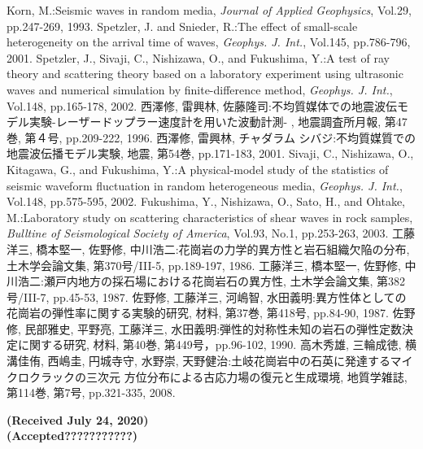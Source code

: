 \documentclass{jsce}
\begin{document}
\begin{thebibliography}{99}
\begin{spacing}{1.175}
	Korn, M.:Seismic waves in random media, 
	{\it Journal of Applied Geophysics}, Vol.29, pp.247-269, 1993.
	Spetzler, J. and Snieder, R.:The effect of small-scale heterogeneity on the arrival time of waves, 
	{\it Geophys. J. Int.}, Vol.145, pp.786-796, 2001. 
	Spetzler, J., Sivaji, C., Nishizawa, O., and Fukushima, Y.:A test of ray theory and scattering theory based on
	a laboratory experiment using ultrasonic waves and numerical simulation by finite-difference method, 
	{\it Geophys. J. Int.}, Vol.148, pp.165-178, 2002. 
\newpage
{}
	西澤修, 雷興林, 佐藤隆司:不均質媒体での地震波伝モデル実験-レーザードップラー速度計を用いた波動計測-
	, 地震調査所月報, 第47巻, 第４号, pp.209-222, 1996.
	西澤修, 雷興林, チャダラム シバジ:不均質媒質での地震波伝播モデル実験, 
	地震, 第54巻, pp.171-183, 2001.
	Sivaji, C., Nishizawa, O., Kitagawa, G., and Fukushima, Y.:A physical-model study of the statistics of seismic waveform fluctuation in random heterogeneous media, 
	{\it Geophys. J. Int.}, Vol.148, pp.575-595, 2002. 
	Fukushima, Y., Nishizawa, O., Sato, H., and Ohtake, M.:Laboratory study on scattering characteristics of shear waves 
	in rock samples, {\it Bulltine of Seismological Society of America}, Vol.93, No.1, pp.253-263, 2003.
	工藤洋三, 橋本堅一, 佐野修, 中川浩二:花崗岩の力学的異方性と岩石組織欠陥の分布,
	土木学会論文集, 第370号/III-5, pp.189-197, 1986.
	工藤洋三, 橋本堅一, 佐野修, 中川浩二:瀬戸内地方の採石場における花崗岩石の異方性, 
	土木学会論文集, 第382号/III-7, pp.45-53, 1987.
	佐野修, 工藤洋三, 河嶋智, 水田義明:異方性体としての花崗岩の弾性率に関する実験的研究, 
	材料, 第37巻, 第418号, pp.84-90, 1987.
	佐野修, 民部雅史, 平野亮, 工藤洋三, 水田義明:弾性的対称性未知の岩石の弾性定数決定に関する研究, 
	材料, 第40巻, 第449号，pp.96-102, 1990.
	高木秀雄, 三輪成徳, 横溝佳侑, 西嶋圭, 円城寺守, 水野崇, 天野健治:土岐花崗岩中の石英に発達するマイクロクラックの三次元
	方位分布による古応力場の復元と生成環境, 地質学雑誌, 第114巻, 第7号, pp.321-335, 2008.
\end{spacing}
\end{thebibliography}
\begin{flushright}
	\small
	\bf{ (Received July 24, 2020)\\
	(Accepted???????????)}
\end{flushright}
\end{document}
